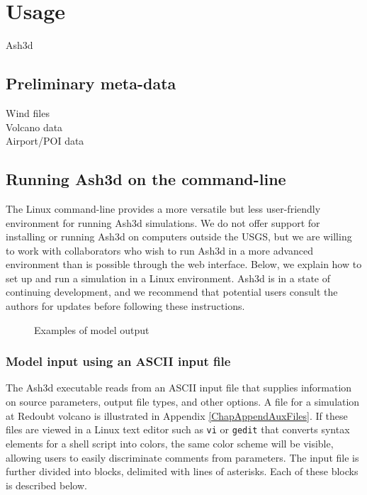 \chapter{Usage}\label{ChapUsage}
Ash3d 


\section{Preliminary meta-data}\label{ChapUsageSecPrelimData}
Wind files\\
Volcano data\\
Airport/POI data

\section{Running Ash3d on the command-line}\label{ChapUsageSecCommandLine}
The Linux command-line provides a more versatile but less
user-friendly environment for running Ash3d simulations.
We do not offer support for installing or running Ash3d
on computers outside the USGS, but we are willing to work
with collaborators who wish to run Ash3d in a more advanced
environment than is possible through the web interface.
Below, we explain how to set up and run a simulation in a
Linux environment. Ash3d is in a state of continuing
development, and we recommend that potential users consult
the authors for updates before following these instructions.

\begin{figure}[htbp]
\parbox{15cm}{\caption{\label{FigAsh3dOutput}
Examples of model output}}
\end{figure}

\subsection{Model input using an ASCII input file}
The Ash3d executable reads from an ASCII input file that
supplies information on source parameters, output file types,
and other options. A file for a simulation at Redoubt volcano
is illustrated in Appendix \ref{ChapAppendAuxFiles}.
If these
files are viewed in a Linux text editor such as \texttt{vi} or
\texttt{gedit}
that converts syntax elements for a shell script into colors,
the same color scheme will be visible, allowing users to easily
discriminate comments from parameters. The input file is further
divided into blocks, delimited with lines of asterisks. Each of
these blocks is described below.

